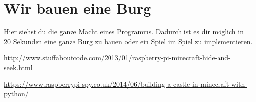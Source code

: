\section{Wir bauen eine Burg}

Hier siehst du die ganze Macht eines Programms. Dadurch ist es dir möglich in 20 Sekunden eine ganze Burg zu bauen oder ein Spiel im Spiel zu implementieren.

	\url{http://www.stuffaboutcode.com/2013/01/raspberry-pi-minecraft-hide-and-seek.html}
	
	\url{https://www.raspberrypi-spy.co.uk/2014/06/building-a-castle-in-minecraft-with-python/}
